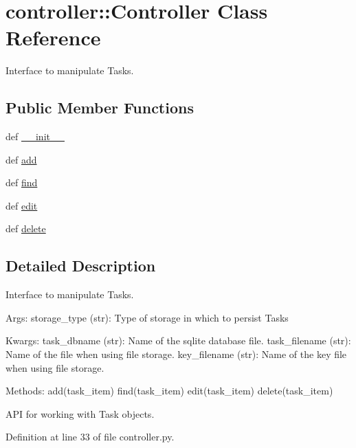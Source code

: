 \hypertarget{classcontroller_1_1Controller}{
\section{controller\-:\-:\-Controller \-Class \-Reference}
\label{classcontroller_1_1Controller}
}


\-Interface to manipulate \-Tasks.  


\subsection*{\-Public \-Member \-Functions}
\begin{DoxyCompactItemize}
\item 
def \hyperlink{classcontroller_1_1Controller_a2792c7e8125686af1f3b942bb861a1b7}{\-\_\-\-\_\-init\-\_\-\-\_\-}
\item 
def \hyperlink{classcontroller_1_1Controller_a4540b41b591ba7844cea2004c4c3fa73}{add}
\item 
def \hyperlink{classcontroller_1_1Controller_ac29e868e3a4a0baf42201008b96ce7eb}{find}
\item 
def \hyperlink{classcontroller_1_1Controller_a39cc3bff3164e8ec52b2b4d50bbd5575}{edit}
\item 
def \hyperlink{classcontroller_1_1Controller_a81b5ea991456c3b37d02d84c790d67f0}{delete}
\end{DoxyCompactItemize}


\subsection{\-Detailed \-Description}
\-Interface to manipulate \-Tasks. 

\-Args\-: storage\-\_\-type (str)\-: \-Type of storage in which to persist \-Tasks

\-Kwargs\-: task\-\_\-dbname (str)\-: \-Name of the sqlite database file. task\-\_\-filename (str)\-: \-Name of the file when using file storage. key\-\_\-filename (str)\-: \-Name of the key file when using file storage.

\-Methods\-: add(task\-\_\-item) find(task\-\_\-item) edit(task\-\_\-item) delete(task\-\_\-item)

\-A\-P\-I for working with \-Task objects. 

\-Definition at line 33 of file controller.\-py.



